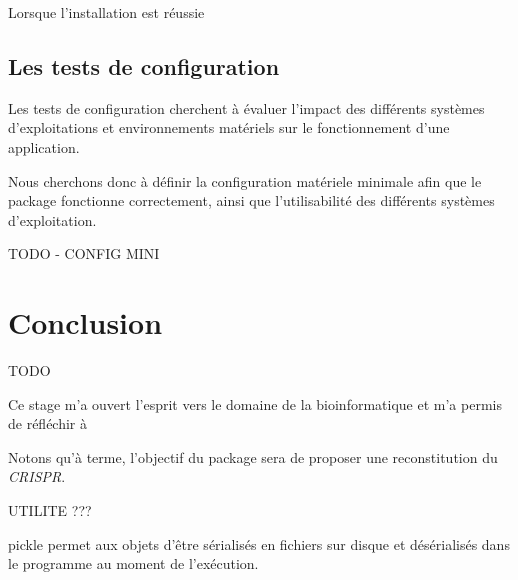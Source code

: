 \documentclass[twoside,a4paper,11pt,frenchb,openany]{report}
\begin{document}
Lorsque l'installation est réussie


\section{Les tests de configuration}

Les tests de configuration cherchent à évaluer l'impact des différents systèmes d'exploitations et environnements matériels sur le fonctionnement d'une application.

Nous cherchons donc à définir la configuration matériele minimale afin que le package fonctionne correctement, ainsi que l'utilisabilité des différents systèmes d'exploitation.

TODO - CONFIG MINI






\chapter*{Conclusion}

TODO

Ce stage m'a ouvert l'esprit vers le domaine de la bioinformatique et m'a permis de réfléchir à 

Notons qu'à terme, l'objectif du package sera de proposer une reconstitution du \textit{CRISPR}.
	




	



UTILITE ???

pickle permet aux objets d'être sérialisés en fichiers sur disque et désérialisés dans le programme au moment de l'exécution.
	
\end{document}
